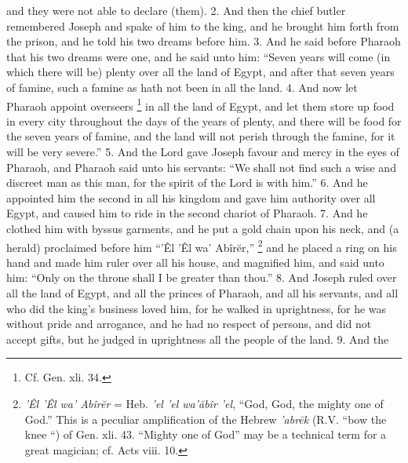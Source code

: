 and they were not able to declare (them). 2. And then the chief butler remembered Joseph and spake of him to the king, and he brought him forth from the prison, and he told his two dreams before him. 3. And he said before Pharaoh that his two dreams were one, and he said unto him: ``Seven years will come (in which there will be) plenty over all the land of Egypt, and after that seven years of famine, such a famine as hath not been in all the land. 4. And now let Pharaoh appoint overseers \footnote{Cf. Gen. xli. 34.} in all the land of Egypt, and let them store up food in every city throughout the days of the years of plenty, and there will be food for the seven years of famine, and the land will not perish through the famine, for it will be very severe.'' 5. And the Lord gave Joseph favour and mercy in the eyes of Pharaoh, and Pharaoh said unto his servants: ``We shall not find such a wise and discreet man as this man, for the spirit of the Lord is with him.'' 6. And he appointed him the second in all his kingdom and gave him authority over all Egypt, and caused him to ride in the second chariot of Pharaoh. 7. And he clothed him with byssus garments, and he put a gold chain upon his neck, and (a herald) proclaimed before him ``’Êl ’Êl wa’ Abîrĕr,'' \footnote{\emph{’Êl ’Êl wa’ Abîrĕr} = Heb. \emph{’el ’el wa’ăbîr ’el}, ``God, God, the mighty one of God.'' This is a peculiar amplification of the Hebrew \emph{’abrēk} (R.V. ``bow the knee ``) of Gen. xli. 43. ``Mighty one of God'' may be a technical term for a great magician; cf. Acts viii. 10.} and he placed a ring on his hand and made him ruler over all his house, and magnified him, and said unto him: ``Only on the throne shall I be greater than thou.'' 8. And Joseph ruled over all the land of Egypt, and all the princes of Pharaoh, and all his servants, and all who did the king's business loved him, for he walked in uprightness, for he was without pride and arrogance, and he had no respect of persons, and did not accept gifts, but he judged in uprightness all the people of the land. 9. And the

